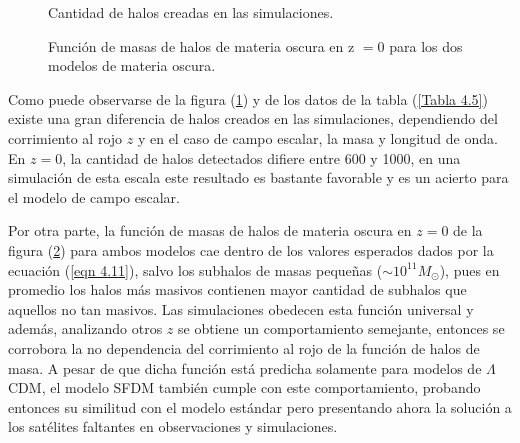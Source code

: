 \documentclass[a4paper,openright,10pt, oneside, final]{book}
\begin{document}
\begin{figure}
\centering
{}
\caption{\footnotesize{Cantidad de halos creadas en las simulaciones.}}\label{fig 4.11}
\end{figure}

\begin{figure}
\centering
  \caption{\footnotesize{Función de masas de halos de materia oscura en z $= 0$ para los dos modelos de materia oscura.}}\label{fig. 4.12}
\end{figure}

Como puede observarse de la figura (\ref{fig 4.11}) y de los datos de la tabla (\ref{Tabla 4.5}) existe una gran diferencia de halos creados en las simulaciones, dependiendo del corrimiento al rojo $z$ y en el caso de campo escalar, la masa y longitud de onda. En $z=0$, la cantidad de halos detectados difiere entre 600 y 1000, en una simulación de esta escala este resultado es bastante favorable y es un acierto para el modelo de campo escalar.

Por otra parte, la función de masas de halos de materia oscura en $z = 0$ de la figura (\ref{fig. 4.12}) para ambos modelos cae dentro de los valores esperados dados por la ecuación (\ref{eqn 4.11}), salvo los subhalos de masas pequeñas ($\sim 10^{11} M_{\odot}$), pues en promedio los halos más masivos contienen mayor cantidad de subhalos que aquellos no tan masivos. Las simulaciones obedecen esta función universal y además, analizando otros $z$ se obtiene un comportamiento semejante, entonces se corrobora la no dependencia del corrimiento al rojo de la función de halos de masa. A pesar de que dicha función está predicha solamente para modelos de $\Lambda$CDM, el modelo SFDM también cumple con este comportamiento, probando entonces su similitud con el modelo estándar pero presentando ahora la solución a los satélites faltantes en observaciones y simulaciones. 
\end{document}
